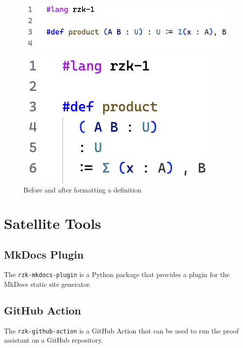 \begin{figure}
  \centering
  \begin{minipage}{0.55\textwidth}
    \centering
    \includegraphics[width=\textwidth]{figs/formatting-before.png}
  \end{minipage}\hfill
  \begin{minipage}{0.35\textwidth}
    \centering
    \includegraphics[width=\textwidth]{figs/formatting-after.png}
  \end{minipage}
  \caption{Before and after formatting a definition}
  \label{figure:formatting}
\end{figure}

\section{Satellite Tools}


\subsection{MkDocs Plugin}

The \texttt{rzk-mkdocs-plugin} is a Python package that provides a plugin for the MkDocs static site generator.

\subsection{GitHub Action}

The \texttt{rzk-github-action} is a GitHub Action that can be used to run the \Rzk{} proof assistant on a GitHub repository.
